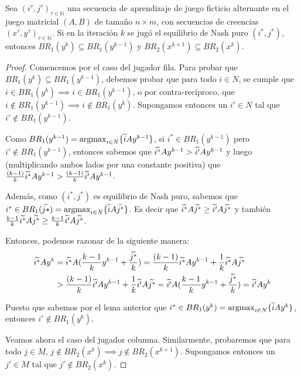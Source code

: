 \begin{lemma}
    Sea $(i^\tau, j^\tau)_{\tau \in \mathbb{N}}$ una secuencia de aprendizaje de juego ficticio alternante en el juego matricial $(A, B)$ de tamaño $n \times m$, con secuencias de creencias $(x^\tau, y^\tau)_{\tau \in \mathbb{N}}$. Si en la iteración $k$ se jugó el equilibrio de Nash puro $(i^*, j^*)$, entonces $BR_1(y^{k}) \subseteq BR_1(y^{k-1})$ y $BR_2(x^{k+1}) \subseteq BR_2(x^{k})$.
\end{lemma}
\begin{proof}
    Comencemos por el caso del jugador fila. Para probar que $BR_1(y^{k}) \subseteq BR_1(y^{k-1})$, debemos probar que para todo $i \in N$, se cumple que $i \in BR_1(y^{k}) \implies i \in BR_1(y^{k-1})$, o por contra-recíproco, que $i \notin BR_1(y^{k-1}) \implies i \notin BR_1(y^{k})$. Supongamos entonces un $i' \in N$ tal que $i' \notin BR_1(y^{k-1})$.

    Como $BR_1(y^{k-1}) = \operatorname*{argmax}_{i \in N} \{\widetilde{i}Ay^{k-1}\}$, si $i^* \in BR_1(y^{k-1})$ pero $i' \notin BR_1(y^{k-1})$, entonces sabemos que $\widetilde{i^*}Ay^{k-1} > \widetilde{i'}Ay^{k-1}$ y luego (multiplicando ambos lados por una constante positiva) que $\frac{(k - 1)}{k} \widetilde{i^*}Ay^{k-1} > \frac{(k - 1)}{k} \widetilde{i'}Ay^{k-1}$.
    
    Además, como $(i^*, j^*)$ es equilibrio de Nash puro, sabemos que $i^* \in BR_1(\widetilde{j*}) = \operatorname*{argmax}_{i \in N} \{\widetilde{i}A\widetilde{j^*}\}$. Es decir que $\widetilde{i^*}A\widetilde{j^*} \ge \widetilde{i'}A\widetilde{j^*}$ y también $\frac{k - 1}{k} \widetilde{i^*}A\widetilde{j^*} \ge \frac{k - 1}{k} \widetilde{i'}A\widetilde{j^*}$.

    Entonces, podemos razonar de la siguiente manera:
    \begin{align*}
        \widetilde{i^*}Ay^k &= \widetilde{i^*}A(\frac{k - 1}{k} y^{k-1} + \frac{\widetilde{j^*}}{k}) = \frac{(k - 1)}{k} \widetilde{i^*}Ay^{k-1} + \frac{1}{k}\widetilde{i^*}A\widetilde{j^*}\\
        &> \frac{(k - 1)}{k} \widetilde{i'}Ay^{k-1} + \frac{1}{k}\widetilde{i'}A\widetilde{j^*} = \widetilde{i'}A(\frac{k - 1}{k} y^{k-1} + \frac{\widetilde{j^*}}{k}) = \widetilde{i'}Ay^k
    \end{align*}

    Puesto que sabemos por el lema anterior que $i^* \in BR_1(y^{k}) = \operatorname*{argmax}_{i \in N} \{\widetilde{i}Ay^{k}\}$, entonces $i' \notin BR_1(y^{k})$.
    
    Veamos ahora el caso del jugador columna. Similarmente, probaremos que para todo $j \in M$, $ j \notin BR_2(x^k) \implies j \notin BR_2(x^{k+1})$. Supongamos entonces un $j' \in M$ tal que $j' \notin BR_2(x^k)$.


\end{proof}
